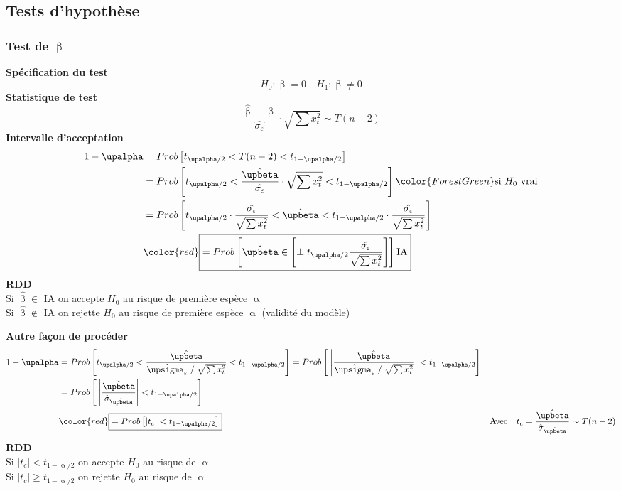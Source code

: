 \documentclass{article}
\newcommand{\hbeta}{\hat{\upbeta}}
\newcommand{\studn}{t_{\upalpha / 2}}
\newcommand{\studp}{t_{1 - \upalpha / 2}}
\begin{document}
\subsection{Tests d'hypothèse}
\subsubsection{Test de $\upbeta$}
	\textbf{Spécification du test} \\
	\[H_0 : \upbeta = 0 \quad H_1 : \upbeta \neq 0\]
	\textbf{Statistique de test}
	\[\frac{\hbeta - \upbeta}{\hat{\sigma_\varepsilon}} \cdot \sqrt{\sum x_t^2} \sim T(n-2) \]
	\textbf{Intervalle d'acceptation}
	\begin{align*}
		1- \upalpha &= Prob\left[\studn < T(n-2) <\studp\right] \\
		&= Prob\left[\studn< \frac{\hbeta}{\hat{\sigma_\varepsilon}} \cdot \sqrt{\sum x_t^2}<\studp\right] {\color{ForestGreen}\textrm{si }H_0 \textrm{ vrai}}\\
		&= Prob\left[\studn \cdot  \frac{\hat{\sigma_\varepsilon}}{\sqrt{\sum x_t^2}} < \hbeta <\studp \cdot \frac{\hat{\sigma_\varepsilon}}{\sqrt{\sum x_t^2}}\right]\\
		&{\color{red} \boxed{= Prob\left[\hbeta \in \left[\pm \; \studn  \frac{\hat{\sigma_\varepsilon}}{\sqrt{\sum x_t^2}}  \right]\right] \textrm{IA} }}
	\end{align*}
	\textbf{RDD } \\
	Si $\hbeta \in $ IA on accepte $H_0$ au risque de première espèce $\upalpha$ \\
	Si $\hbeta \notin $ IA on rejette $H_0$ au risque de première espèce $\upalpha$ {\color{red}(validité du modèle)}

	\textbf{Autre façon de procéder} 
	\begin{align*}
		1- \upalpha &= Prob \left[\studn < \frac{\hbeta}{\hat{\upsigma_\varepsilon} \; / \; \sqrt{\sum x_t^2}} < \studp\right] =  Prob \left[ \: \left\lvert \frac{\hbeta}{\hat{\upsigma_\varepsilon} \; / \; \sqrt{\sum x_t^2}} \right\rvert < \studp\right] \\
		&= Prob\left[ \: \left\lvert \frac{\hbeta}{\hat{\sigma}_{\hat{\upbeta}}} \right\rvert < \studp\right] \\
		&{\color{red} \boxed{= Prob\left[\left\lvert t_c \right\rvert < \studp\right]}} &\textrm{Avec} \quad t_c = \frac{\hbeta}{\hat{\sigma}_{\hat{\upbeta}}} \sim T(n-2)
	\end{align*}
	\textbf{RDD}\\
	Si $|t_c| < \studp $ on accepte $H_0$ au risque de $\upalpha$ \\
	Si $|t_c| \geq \studp $ on rejette $H_0$ au risque de $\upalpha$ \\
\end{document}
